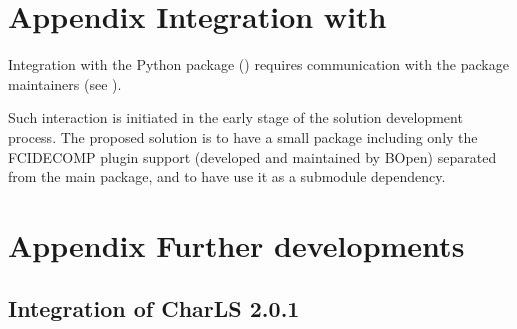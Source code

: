 \documentclass[a4paper,10pt,english]{sphinxmanual}
\begin{document}
\chapter{Appendix \sphinxhyphen{} Integration with }
\label{\detokenize{a_integration_with_hdf5plugin:appendix-integration-with-hdf5plugin}}\label{\detokenize{a_integration_with_hdf5plugin:integration-with-hdf5plugin}}\label{\detokenize{a_integration_with_hdf5plugin::doc}}
\sphinxAtStartPar
{}

\sphinxAtStartPar
Integration with the  Python package ({\hyperref[\detokenize{introduction:hdf5plugin}]{}}) requires communication with the
package maintainers (see {\hyperref[\detokenize{a_users_using_fcidecomp:a-users-using-fcidecomp}]{}}).

\sphinxAtStartPar
Such interaction is initiated in the early stage of the solution development process. The proposed solution is to have
a small package including only the FCIDECOMP plugin support (developed and maintained by B\sphinxhyphen{}Open) separated from the main
 package, and to have  use it as a sub\sphinxhyphen{}module dependency.


\chapter{Appendix \sphinxhyphen{} Further developments}
\label{\detokenize{a_further_developments:appendix-further-developments}}\label{\detokenize{a_further_developments:further-developments}}\label{\detokenize{a_further_developments::doc}}

\section{Integration of CharLS 2.0.1}
\label{\detokenize{a_further_developments:integration-of-charls-2-0-1}}


\renewcommand{\indexname}{Index}
\printindex
\end{document}
